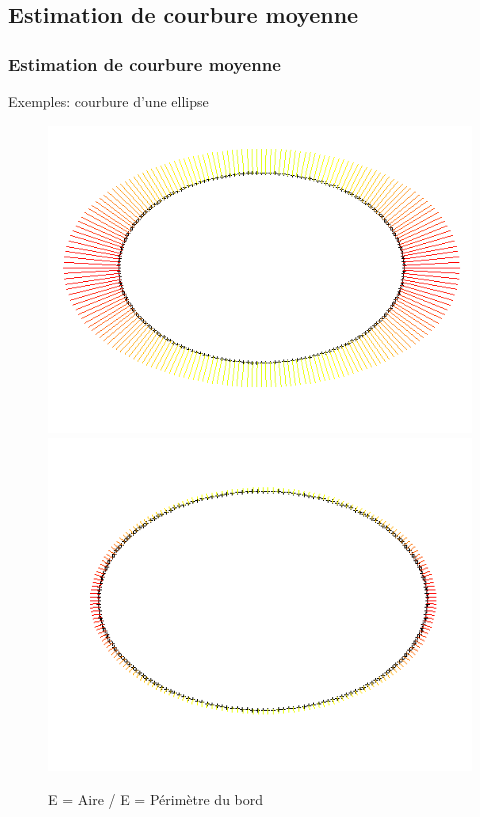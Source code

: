 \documentclass{beamer}
\begin{document}
\subsection{Estimation de courbure moyenne}
\begin{frame}
    \frametitle{Estimation de courbure moyenne}

    Exemples: courbure d'une ellipse
    \begin{figure}
        \centering
        \includegraphics[scale=0.3]{img/curvature-ellipse-200-15-area}
        \includegraphics[scale=0.3]{img/curvature-ellipse-200-15-perimeter}
        \caption{E = Aire / E = Périmètre du bord}
    \end{figure}
\end{frame}
\end{document}
